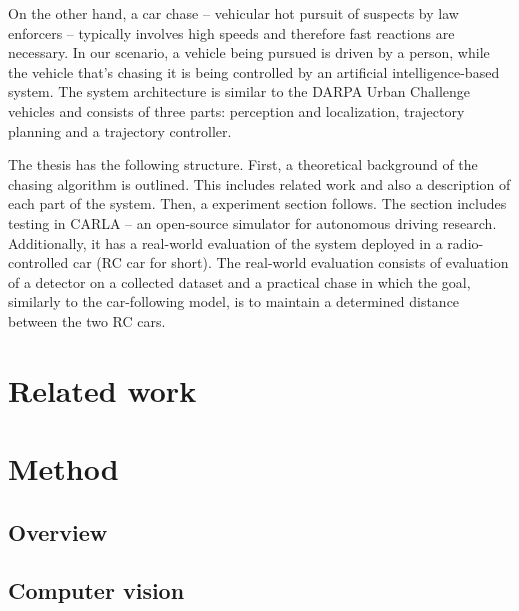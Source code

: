  
On the other hand, a car chase -- vehicular hot pursuit of suspects by law enforcers -- typically involves high speeds and therefore fast reactions are necessary. In our scenario, a vehicle being pursued is driven by a person, while the vehicle that's chasing it is being controlled by an artificial intelligence-based system. The system architecture is similar to the DARPA Urban Challenge vehicles \cite{Bertha}\cite{darpa2}\cite{darpa_book} and consists of three parts: perception and localization, trajectory planning and a trajectory controller. \par


The thesis has the following structure. First, a theoretical background of the chasing algorithm is outlined. This includes related work and also a description of each part of the system. Then, a experiment section follows. The section includes testing in CARLA -- an open-source simulator for autonomous driving research. Additionally, it has a real-world evaluation of the system deployed in a radio-controlled car (RC car for short). The real-world evaluation consists of evaluation of a detector on a collected dataset and a practical chase in which the goal, similarly to the car-following model, is to maintain a determined distance between the two RC cars.

\chapter{Related work}

\chapter{Method}
\section{Overview}

\section{Computer vision}
